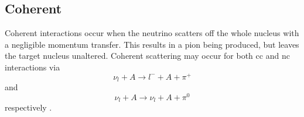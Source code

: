 \subsection*{Coherent}
Coherent interactions occur when the neutrino scatters off the  whole nucleus with a negligible momentum transfer. This results in a pion being produced, but leaves the target nucleus unaltered. Coherent scattering may occur for both \gls{cc} and \gls{nc} interactions via
\begin{equation}
    \nu_l + A \rightarrow l^- + A + \pi^+
\end{equation}
and
\begin{equation}
    \nu_l + A \rightarrow \nu_l + A + \pi^0
\end{equation}
respectively \cite{Measurement_of_the_Water_to_Scintillator_Charged-Current_Cross-Section_Ratio_for_Muon_Neutrinos_at_the_T2K_Near_Detector_thesis}\cite{Adjusting_neutrino_interaction_models_and_evaluating_uncertainties_using_NOvA_near_detector_data}. 

